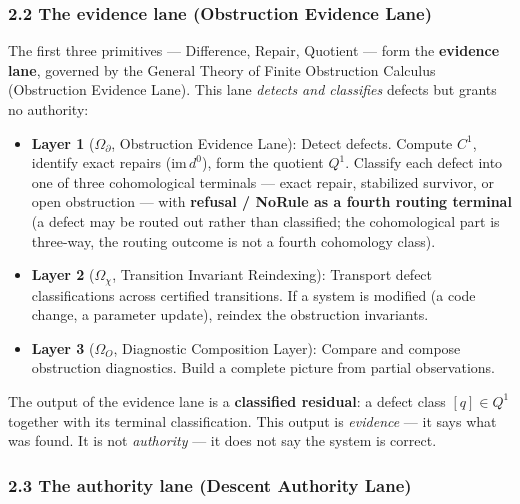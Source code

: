 \documentclass[
  10pt,
]{article}
\providecommand{\tightlist}{%
  \setlength{\itemsep}{0pt}\setlength{\parskip}{0pt}}
\providecommand{\tightlist}{%
  \setlength{\itemsep}{0pt}\setlength{\parskip}{0pt}}
\begin{document}
\subsubsection{2.2 The evidence lane (Obstruction Evidence Lane)}\label{the-evidence-lane-obstruction-evidence-lane}

The first three primitives --- Difference, Repair, Quotient --- form the \textbf{evidence lane}, governed by the General Theory of Finite Obstruction Calculus (Obstruction Evidence Lane). This lane \emph{detects and classifies} defects but grants no authority:

\begin{itemize}
\tightlist
\item
  \textbf{Layer 1} (\protect\hypertarget{math-E0023-0026}{}{\(\Omega_\partial\)}, Obstruction Evidence Lane): Detect defects. Compute \protect\hypertarget{math-E0012-0027}{}{\(C^1\)}, identify exact repairs (\protect\hypertarget{math-E0024-0028}{}{\(\text{im}\,d^0\)}), form the quotient \protect\hypertarget{math-E0006-0029}{}{\(Q^1\)}. Classify each defect into one of three cohomological terminals --- exact repair, stabilized survivor, or open obstruction --- with \textbf{refusal / NoRule as a fourth routing terminal} (a defect may be routed out rather than classified; the cohomological part is three-way, the routing outcome is not a fourth cohomology class).
\item
  \textbf{Layer 2} (\protect\hypertarget{math-E0025-0030}{}{\(\Omega_\chi\)}, Transition Invariant Reindexing): Transport defect classifications across certified transitions. If a system is modified (a code change, a parameter update), reindex the obstruction invariants.
\item
  \textbf{Layer 3} (\protect\hypertarget{math-E0026-0031}{}{\(\Omega_O\)}, Diagnostic Composition Layer): Compare and compose obstruction diagnostics. Build a complete picture from partial observations.
\end{itemize}

The output of the evidence lane is a \textbf{classified residual}: a defect class \protect\hypertarget{math-E0017-0032}{}{\([q] \in Q^1\)} together with its terminal classification. This output is \emph{evidence} --- it says what was found. It is not \emph{authority} --- it does not say the system is correct.

\subsubsection{2.3 The authority lane (Descent Authority Lane)}\label{the-authority-lane-descent-authority-lane}
\end{document}

